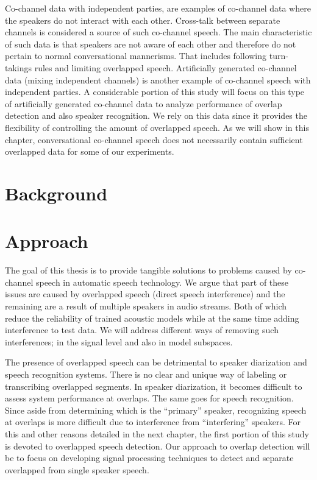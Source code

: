 Co-channel data with independent parties, are examples of co-channel data where the speakers do not interact with each other. 
Cross-talk between separate channels is considered a source of such co-channel speech. 
The main characteristic of such data is that speakers are not aware of each other and therefore do not pertain to normal conversational mannerisms. 
That includes following turn-takings rules and limiting overlapped speech. 
Artificially generated co-channel data (mixing independent channels) is another example of co-channel speech with independent parties. 
A considerable portion of this study will focus on this type of artificially generated co-channel data to analyze performance of overlap detection and also speaker recognition. 
We rely on this data since it provides the flexibility of controlling the amount of overlapped speech. 
As we will show in this chapter, conversational co-channel speech does not necessarily contain sufficient overlapped data for some of our experiments. 

\section{Background}
\label{sec:background}



\section{Approach}

The goal of this thesis is to provide tangible solutions to problems caused by co-channel speech in automatic speech technology. 
We argue that part of these issues are caused by overlapped speech (direct speech interference) and the remaining are a result of multiple speakers in audio streams. 
Both of which reduce the reliability of trained acoustic models while at the same time adding interference to test data. 
We will address different ways of removing such interferences; in the signal level and also in model subspaces. 

The presence of overlapped speech can be detrimental to speaker diarization and speech recognition systems. 
There is no clear and unique way of labeling or transcribing overlapped segments. 
In speaker diarization, it becomes difficult to assess system performance at overlaps. 
The same goes for speech recognition. 
Since aside from determining which is the ``primary'' speaker, recognizing speech at overlaps is more difficult due to interference from ``interfering'' speakers. 
For this and other reasons detailed in the next chapter, the first portion of this study is devoted to overlapped speech detection. 
Our approach to overlap detection will be to focus on developing signal processing techniques to detect and separate overlapped from single speaker speech. 

